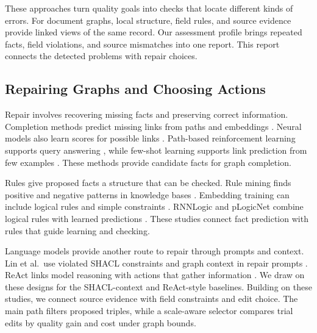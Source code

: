 These approaches turn quality goals into checks that locate different
kinds of errors.
For document graphs, local structure, field rules, and source evidence
provide linked views of the same record.
Our assessment profile brings repeated facts, field violations, and source
mismatches into one report.
This report connects the detected problems with repair choices.

\subsection{Repairing Graphs and Choosing Actions}

Repair involves recovering missing facts and preserving correct information.
Completion methods predict missing links from paths and embeddings
\citep{ref_lao2011,ref_bordes2013,ref_yang2015,ref_shi2017}.
Neural models also learn scores for possible links
\citep{ref_dettmers2018,ref_zhu2021}.
Path-based reinforcement learning supports query answering
\citep{ref_das2018}, while few-shot learning supports link prediction from
few examples \citep{ref_chen2019}.
These methods provide candidate facts for graph completion.

Rules give proposed facts a structure that can be checked.
Rule mining finds positive and negative patterns in knowledge bases
\citep{ref_galarraga2013,ref_ortona2018}.
Embedding training can include logical rules and simple constraints
\citep{ref_guo2016,ref_ding2018}.
RNNLogic and pLogicNet combine logical rules with learned predictions
\citep{ref_qu2021,ref_qu2019}.
These studies connect fact prediction with rules that guide learning and
checking.

Language models provide another route to repair through prompts and context.
Lin et al.\ use violated SHACL constraints and graph context in repair
prompts \citep{ref_lin2025}.
ReAct links model reasoning with actions that gather information
\citep{ref_yao2023react}.
We draw on these designs for the SHACL-context and ReAct-style baselines.
Building on these studies, we connect source evidence with field constraints
and edit choice.
The main path filters proposed triples, while a scale-aware selector
compares trial edits by quality gain and cost under graph bounds.
